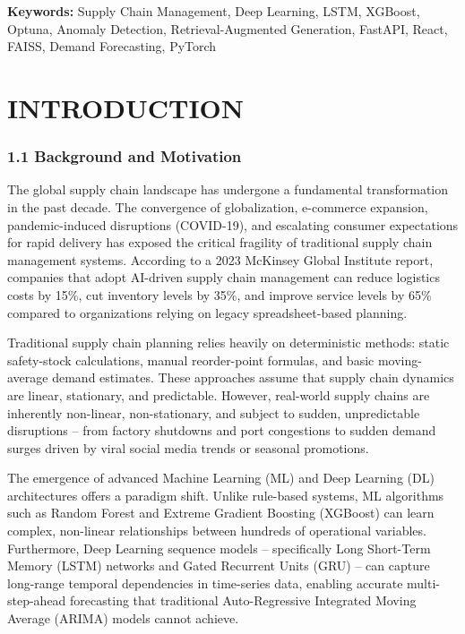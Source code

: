 \documentclass[12pt, a4paper]{report}
\begin{document}
\vspace{0.2in}
\noindent \textbf{Keywords:} Supply Chain Management, Deep Learning, LSTM, XGBoost, Optuna, Anomaly Detection, Retrieval-Augmented Generation, FastAPI, React, FAISS, Demand Forecasting, PyTorch

\tableofcontents
\listoffigures
\listoftables

\clearpage
{}

\chapter{INTRODUCTION}

\subsection{1.1 Background and Motivation}

The global supply chain landscape has undergone a fundamental transformation in the past decade. The convergence of globalization, e-commerce expansion, pandemic-induced disruptions (COVID-19), and escalating consumer expectations for rapid delivery has exposed the critical fragility of traditional supply chain management systems. According to a 2023 McKinsey Global Institute report, companies that adopt AI-driven supply chain management can reduce logistics costs by 15\%, cut inventory levels by 35\%, and improve service levels by 65\% compared to organizations relying on legacy spreadsheet-based planning.

Traditional supply chain planning relies heavily on deterministic methods: static safety-stock calculations, manual reorder-point formulas, and basic moving-average demand estimates. These approaches assume that supply chain dynamics are linear, stationary, and predictable. However, real-world supply chains are inherently non-linear, non-stationary, and subject to sudden, unpredictable disruptions -- from factory shutdowns and port congestions to sudden demand surges driven by viral social media trends or seasonal promotions.

The emergence of advanced Machine Learning (ML) and Deep Learning (DL) architectures offers a paradigm shift. Unlike rule-based systems, ML algorithms such as Random Forest and Extreme Gradient Boosting (XGBoost) can learn complex, non-linear relationships between hundreds of operational variables. Furthermore, Deep Learning sequence models -- specifically Long Short-Term Memory (LSTM) networks and Gated Recurrent Units (GRU) -- can capture long-range temporal dependencies in time-series data, enabling accurate multi-step-ahead forecasting that traditional Auto-Regressive Integrated Moving Average (ARIMA) models cannot achieve.
\end{document}
